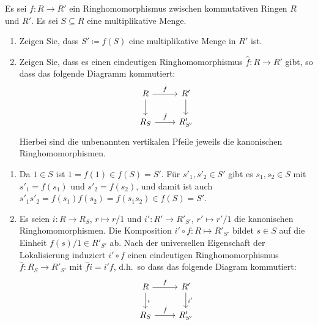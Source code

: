 \begin{question}[subtitle = Funktorialität von Lokalisierung]
  Es sei $f \colon R \to R'$ ein Ringhomomorphismus zwischen kommutativen Ringen $R$ und $R'$.
  Es sei $S \subseteq R$ eine multiplikative Menge.
  \begin{enumerate}
    \item
      Zeigen Sie, dass $S' \coloneqq f(S)$ eine multiplikative Menge in $R'$ ist.
    \item
      Zeigen Sie, dass es einen eindeutigen Ringhomomorphismus $\hat{f} \colon R \to R'$ gibt, so dass das folgende Diagramm kommutiert:
      \[
        \begin{tikzcd}[ampersand replacement=\&]
              R
              \arrow{r}{f}
              \arrow{d}
          \&  R'
              \arrow{d}
          \\
              R_S
              \arrow{r}{\hat{f}}
          \&  R'_{S'}
        \end{tikzcd}
      \]
      Hierbei sind die unbenannten vertikalen Pfeile jeweils die kanonischen Ringhomomorphismen.
  \end{enumerate}
\end{question}


\begin{solution}
  \begin{enumerate}
    \item
      Da $1 \in S$ ist $1 = f(1) \in f(S) = S'$.
      Für $s'_1, s'_2 \in S'$ gibt es $s_1, s_2 \in S$ mit $s'_1 = f(s_1)$ und $s'_2 = f(s_2)$, und damit ist auch $s'_1 s'_2 = f(s_1) f(s_2) = f(s_1 s_2) \in f(S) = S'$.
    \item
      Es seien $i \colon R \to R_S$, $r \mapsto r/1$ und $i' \colon R' \to R'_{S'}$, $r' \mapsto r'/1$ die kanonischen Ringhomomorphismen.
      Die Komposition $i' \circ f \colon R \mapsto R'_{S'}$ bildet $s \in S$ auf die Einheit $f(s)/1 \in R'_{S'}$
      ab.
      Nach der universellen Eigenschaft der Lokalisierung induziert $i' \circ f$ einen eindeutigen Ringhomomorphismus $\hat{f} \colon R_S \to R'_{S'}$ mit $\hat{f} i = i' f$, d.h.\ so dass das folgende Diagram kommutiert:
      \[
        \begin{tikzcd}[ampersand replacement = \&]
              R
              \arrow{r}{f}
              \arrow{d}{i}
          \&  R'
              \arrow{d}{i'}
          \\
              R_S
              \arrow{r}{\hat{f}}
          \&  R'_{S'}
        \end{tikzcd}
      \]
  \end{enumerate}
\end{solution}


